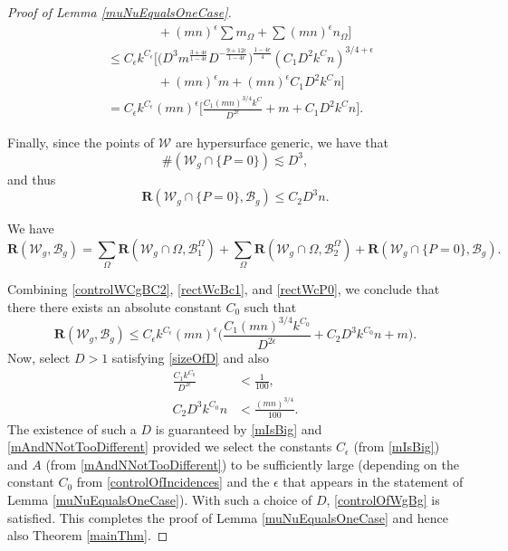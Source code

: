\documentclass[reqno]{amsart}
\theoremstyle{definition}
\theoremstyle{remark}
\theoremstyle{remark}
\newcommand{\WC}{\mathcal W}
\newcommand{\BC}{\mathcal B}
\newcommand{\rect}{\mathbf{R}}
\begin{document}
\begin{proof}[Proof of Lemma \ref{muNuEqualsOneCase}]
\begin{equation}
\begin{split}
&\phantom{\leq C_\epsilon k^{C_\epsilon}\bigg[} +(mn)^{\epsilon}\sum m_\Omega+ \sum (mn)^{\epsilon}n_{\Omega}\bigg]\\
&\leq C_\epsilon k^{C_\epsilon}\bigg[\Big(D^3 m^{\frac{3+4\epsilon}{1-4\epsilon}} D^{-\frac{9+12\epsilon}{1-4\epsilon}}\Big)^{\frac{1-4\epsilon}{4}}(C_1D^2k^C n)^{3/4+\epsilon}  \\
& \phantom{\leq C_\epsilon k^{C_\epsilon}\bigg[} + (mn)^{\epsilon}m + (mn)^{\epsilon}C_1D^2k^Cn\bigg]\\
&= C_\epsilon k^{C_\epsilon}(mn)^{\epsilon}\bigg[\frac{C_1(mn)^{3/4}k^C}{D^{2\epsilon}}+m+C_1D^2k^Cn\bigg].
\end{split}
\end{equation}

Finally, since the points of $\WC$ are hypersurface generic, we have that
\begin{equation*}
\#(\WC_g\cap\{P=0\})\lesssim D^3,
\end{equation*}
and thus
\begin{equation}\label{rectWcP0}
 \rect(\WC_g\cap\{P=0\},\BC_g)\leq C_2D^3 n.
\end{equation}

We have
\begin{equation}
 \rect(\WC_g,\BC_g) = \sum_{\Omega}\rect(\WC_g\cap\Omega,\BC^{\Omega}_1)+ \sum_{\Omega}\rect(\WC_g\cap\Omega,\BC^{\Omega}_2)+ \rect(\WC_g\cap\{P=0\},\BC_g).
\end{equation}

Combining \eqref{controlWCgBC2}, \eqref{rectWcBc1}, and \eqref{rectWcP0}, we conclude that there there exists an absolute constant $C_0$ such that
\begin{equation}\label{controlOfIncidences}
 \rect(\WC_g,\BC_g) \leq C_\epsilon k^{C_\epsilon} (mn)^\epsilon\Big(\frac{C_1 (mn)^{3/4}k^{C_0}}{D^{2\epsilon}} + C_2 D^3k^{C_0} n + m\Big).
\end{equation}
Now, select $D>1$ satisfying \eqref{sizeOfD} and also
\begin{align}
 \frac{C_1k^{C_0}}{D^{2\epsilon}}&<\frac{1}{100},\label{firstDcondition}\\
 C_2D^3k^{C_0}n &< \frac{(mn)^{3/4}}{100}\label{secondDcondition}.
\end{align}
The existence of such a $D$ is guaranteed by \eqref{mIsBig} and \eqref{mAndNNotTooDifferent} provided we select the constants $C_\epsilon$ (from \eqref{mIsBig}) and $A$ (from \eqref{mAndNNotTooDifferent}) to be sufficiently large (depending on the constant $C_0$ from \eqref{controlOfIncidences} and the $\epsilon$ that appears in the statement of Lemma \ref{muNuEqualsOneCase}). With such a choice of $D$, \eqref{controlOfWgBg} is satisfied. This completes the proof of Lemma \ref{muNuEqualsOneCase} and hence also Theorem \ref{mainThm}.
\end{proof}
\end{document}

